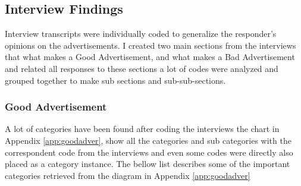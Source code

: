 \subsection{Interview Findings}
Interview transcripts were individually coded to generalize the responder's opinions on the advertisements. I created two main sections from the interviews that what makes a Good Advertisement, and what makes a Bad Advertisement and related all responses to these sections a lot of codes were analyzed and grouped together to make sub sections and sub-sub-sections.

\subsubsection{Good Advertisement}
A lot of categories have been found after coding the interviews the chart in Appendix \ref{app:goodadver}, show all the categories and sub categories with the correspondent code from the interviews and even some codes were directly also placed as a category instance. The bellow list describes some of the important categories retrieved from the diagram in Appendix \ref{app:goodadver}

